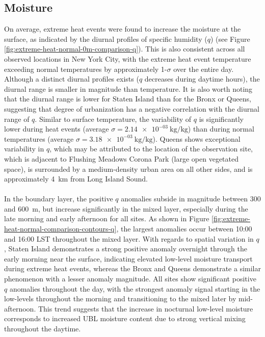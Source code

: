\documentclass[num-refs]{wiley-article}
\begin{document}
\subsection{Moisture}
On average, extreme heat events were found to increase the moisture at the surface, as indicated by the diurnal profiles of specific humidity ($q$) (see Figure \ref{fig:extreme-heat-normal-0m-comparison-q}). This is also consistent across all observed locations in New York City, with the extreme heat event temperature exceeding normal temperatures by approximately 1-$\sigma$ over the entire day. Although a distinct diurnal profiles exists ($q$ decreases during daytime hours), the diurnal range is smaller in magnitude than temperature. It is also worth noting that the diurnal range is lower for Staten Island than for the Bronx or Queens, suggesting that degree of urbanization has a negative correlation with the diurnal range of $q$. Similar to surface temperature, the variability of $q$ is significantly lower during heat events (average $ \sigma = \SI{2.14e-03}{\kilo\gram\per\kilo\gram} $) than during normal temperatures (average $ \sigma = \SI{3.18e-03}{\kilo\gram\per\kilo\gram} $). Queens shows exceptional variability in $q$, which may be attributed to the location of the observation site, which is adjacent to Flushing Meadows Corona Park (large open vegetated space), is surrounded by a medium-density urban area on all other sides, and is approximately \SI{4}{\kilo\meter} from Long Island Sound. 
\\ \\
In the boundary layer, the positive $q$ anomalies subside in magnitude between 300 and \SI{600}{\meter}, but increase significantly in the mixed layer, especially during the late morning and early afternoon for all sites. As shown in Figure \ref{fig:extreme-heat-normal-comparison-contours-q}, the largest anomalies occur between 10:00 and 16:00 LST throughout the mixed layer. With regards to spatial variation in $q$, Staten Island demonstrates a strong positive anomaly overnight through the early morning near the surface, indicating elevated low-level moisture transport during extreme heat events, whereas the Bronx and Queens demonstrate a similar phenomenon with a lesser anomaly magnitude. All sites show significant positive $q$ anomalies throughout the day, with the strongest anomaly signal starting in the low-levels throughout the morning and transitioning to the mixed later by mid-afternoon. This trend suggests that the increase in nocturnal low-level moisture corresponds to increased UBL moisture content due to strong vertical mixing throughout the daytime.
\end{document}
